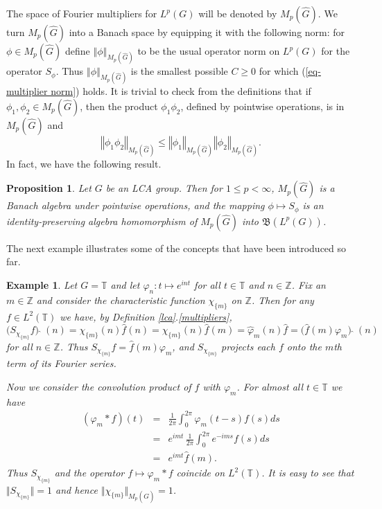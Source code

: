 \documentclass[honours,12pt]{unswthesis}
\newcommand{\T}{\mathbb{T}}
\newcommand{\Z}{\mathbb{Z}}
\newcommand{\B}{\mathfrak{B}}
\newcommand{\hatt}[1]{\widehat #1}
\newcommand{\reff}[2]{\ref{#1}.\ref{#2}}
\def\norm#1{\left \Vert #1 \right \Vert}
\def\ssnorm#1{\Vert #1 \Vert}
\newtheorem{proposition}[theorem]{Proposition}
\newtheorem{example}[theorem]{Example}
\numberwithin{equation}{section}
\begin{document}
The space of Fourier multipliers for $L^p(G)$ will be denoted by
$M_p(\hatt{G})$. We turn $M_p(\hatt{G})$ into a Banach space by equipping it 
with
the following norm: for $\phi\in M_p(\hatt{G})$ define
$\norm{\phi}_{M_p(\hatt{G})}$ to be the usual operator norm on $L^p(G)$ for the
operator $S_{\phi}$. Thus $\norm{\phi}_{M_p(\hatt{G})}$ is the smallest
possible $C\geq 0$ for which (\ref{eq-multiplier norm}) holds. It is
trivial to check from the definitions that if $\phi_1,\phi_2\in M_p(\hatt{G})$,
then the product $\phi_1\phi_2$, defined by pointwise operations, is in
$M_p(\hatt{G})$ and
\[\norm{\phi_1\phi_2}_{M_p(\hatt{G})}\leq\norm{\phi_1}_{M_p(\hatt{G})}
\norm{\phi_2}_{M_p(\hatt{G})}.\]
In fact, we have the following result.

\begin{proposition}\label{multiplier algebra}\cite[\S3]{BG Spectral}
Let $G$ be an LCA group. Then for $1\leq p<\infty$,
$M_p(\hatt{G})$ is a Banach algebra under pointwise operations, and the mapping
$\phi\mapsto S_{\phi}$ is an identity-preserving algebra homomorphism of
$M_p(\hatt{G})$ into $\B(L^p(G))$.
\end{proposition}

The next example illustrates some of the concepts that
have been introduced so far.

\begin{example}\label{lca example}
Let $G=\T$ and let $\varphi_n:t\mapsto e^{int}$ for all $t\in\T$ and $n\in\Z$.
Fix an $m\in\Z$ 
and consider the characteristic function $\chi_{\{m\}}$ on $\Z$.
Then for any $f\in L^2(\T)$ we have, by Definition \reff{lca}{multipliers},
\[\bigl(S_{\chi_{\{m\}}}f\bigr)\,\hatt{\,}\,(n)=\chi_{\{m\}}(n)\hatt{f}(n)
=\chi_{\{m\}}(n)\hatt{f}(m)=\hatt{\varphi}_m(n)\hatt{f}=
\bigl(\hatt{f}(m)\varphi_m\bigr)\,\hatt{\,}\,(n)\]
for all $n\in\Z$. Thus $S_{\chi_{\{m\}}}f=\hatt{f}(m)\varphi_m$, and
$S_{\chi_{\{m\}}}$ projects each $f$ onto the $m$th term of its Fourier
series.

Now we consider the convolution product of $f$ with $\varphi_m$.
For almost all $t\in\T$ we have
\begin{eqnarray*}
(\varphi_m*f)(t) &=& \frac{1}{2\pi}\int_0^{2\pi}\varphi_m(t-s)f(s)ds \\
& = & e^{imt}\,\frac{1}{2\pi}\int_0^{2\pi}e^{-ims}f(s)ds \\
& = & e^{imt}\hatt{f}(m).
\end{eqnarray*}
Thus $S_{\chi_{\{m\}}}$ and the operator $f\mapsto\varphi_m*f$ coincide on
$L^2(\T)$. It is easy to see that $\ssnorm{S_{\chi_{\{m\}}}}=1$ and hence
$\ssnorm{\chi_{\{m\}}}_{M_p(\hatt{G})}=1$.
\end{example}
\end{document}

